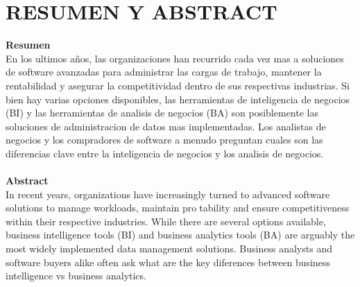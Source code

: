 \section{RESUMEN Y ABSTRACT} 
\begin{flushleft}

\textbf{Resumen}\\
En los ultimos años, las organizaciones han recurrido cada vez mas a soluciones de software
avanzadas para administrar las cargas de trabajo, mantener la rentabilidad y asegurar la
competitividad dentro de sus respectivas industrias. Si bien hay varias opciones disponibles,
las herramientas de inteligencia de negocios (BI) y las herramientas de analisis de negocios
(BA) son posiblemente las soluciones de administracion de datos mas implementadas. Los
analistas de negocios y los compradores de software a menudo preguntan cuales son las diferencias
clave entre la inteligencia de negocios y los analisis de negocios.
\textbf{}\\
\textbf{}\\

\textbf{Abstract}\\
In recent years, organizations have increasingly turned to advanced software
solutions to manage workloads, maintain protability and ensure competitiveness
within their respective industries. While there are several options available, business
intelligence tools (BI) and business analytics tools (BA) are arguably the most
widely implemented data management solutions. Business analysts and software
buyers alike often ask what are the key diferences between business intelligence vs business analytics.












\end{flushleft}